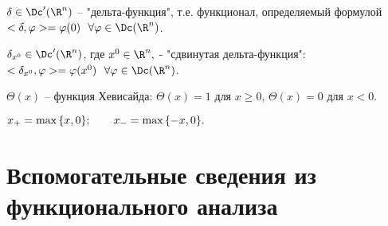 \documentclass[a4paper]{article}
\def\d{\delta}
\def\fy{\varphi}
\begin{document}
\noindent
$\d\in \Dc'(\R^n)$ -- "дельта-функция", т.е. функционал, определяемый
формулой $<\d, \fy> = \fy(0)\ \ \forall \fy\in \Dc(\R^n)$.

\noindent
$\d_{x^0}\in\Dc'(\R^n)$, где $x^0\in\R^n,$ - "сдвинутая дельта-функция":
$<\d_{x^0}, \fy> = \fy(x^0)\ \ \forall \fy\in \Dc(\R^n)$.

\noindent
$\Theta(x)$ -- функция Хевисайда: $\Theta(x)=1$ для $x\ge0$, $\Theta(x)=0$
для $x<0$.

\noindent
$x_+=\hbox{max}\, \{x,0\}; \qquad x_-=\hbox{max}\, \{-x,0\}.$

\section{Вспомогательные сведения из функционального анализа}
\end{document}

